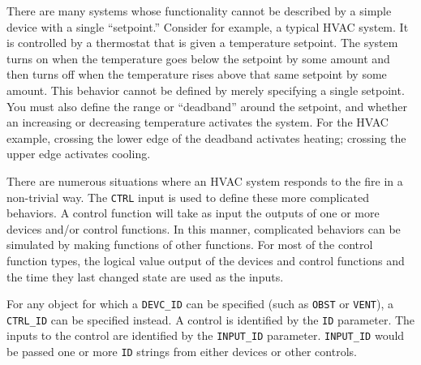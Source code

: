\documentclass[11pt]{book}
\newcommand{\ct}{\tt\small}
\begin{document}
There are many systems whose functionality cannot be described by a simple device with a single ``setpoint.''
Consider for example, a typical HVAC system.  It is controlled by a thermostat that is given a temperature setpoint.
The system turns on when the temperature goes below the setpoint by some
amount and then turns off when the temperature rises above that same setpoint by some amount.
This behavior cannot be defined by merely specifying a single setpoint.
You must also define the range or ``deadband'' around the setpoint, and whether an
increasing or decreasing temperature activates the system.  For the HVAC example, crossing the
lower edge of the deadband activates heating; crossing the upper edge activates cooling.

There are numerous situations where an HVAC system responds to
the fire in a non-trivial way.  The {\ct CTRL} input is used to define these more complicated behaviors.
A control function will take as input the outputs of one or more devices and/or control functions.
In this manner, complicated behaviors can be simulated by making functions of other functions.  For most of the
control function types, the logical value output of the devices and control functions and the time they last changed
state are used as the inputs.

For any object for which a {\ct DEVC\_ID} can be specified (such as {\ct OBST} or {\ct VENT}), a {\ct CTRL\_ID} can be
specified instead. A control is identified by the {\ct ID} parameter.  The inputs to the control are identified
by the {\ct INPUT\_ID} parameter.  {\ct INPUT\_ID} would be passed one or more {\ct ID} strings
from either devices or other controls.
\end{document}
